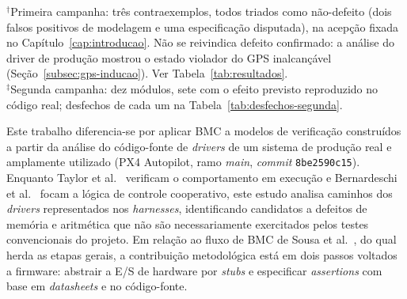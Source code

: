 \begin{table}[p]
\scriptsize
\begin{flushleft}
$^\dagger$Primeira campanha: três contraexemplos, todos triados como não-defeito (dois falsos positivos de modelagem e uma especificação disputada), na acepção fixada no Capítulo~\ref{cap:introducao}. Não se reivindica defeito confirmado: a análise do driver de produção mostrou o estado violador do GPS inalcançável (Seção~\ref{subsec:gps-inducao}). Ver Tabela~\ref{tab:resultados}.\\
$^\ddagger$Segunda campanha: dez módulos, sete com o efeito previsto reproduzido no código
real; desfechos de cada um na Tabela~\ref{tab:desfechos-segunda}.
\end{flushleft}
\end{table}

Este trabalho diferencia-se por aplicar BMC a modelos de verificação construídos
a partir da análise do código-fonte de \textit{drivers} de um sistema de produção
real e amplamente utilizado (PX4 Autopilot, ramo \textit{main},
\textit{commit} \texttt{8be2590c15}). Enquanto Taylor et al.~\cite{Taylor2021}
verificam o comportamento em execução e Bernardeschi et
al.~\cite{Bernardeschi2023} focam a lógica de controle cooperativo, este estudo
analisa caminhos dos \textit{drivers} representados nos \textit{harnesses},
identificando candidatos a defeitos de memória e aritmética que não são
necessariamente exercitados pelos testes convencionais do projeto. Em relação ao fluxo de BMC de Sousa et al.~\cite{Sousa2026}, do qual herda as
etapas gerais, a contribuição metodológica está em dois passos voltados a
firmware: abstrair a E/S de hardware por \textit{stubs} e especificar
\textit{assertions} com base em \textit{datasheets} e no código-fonte.

